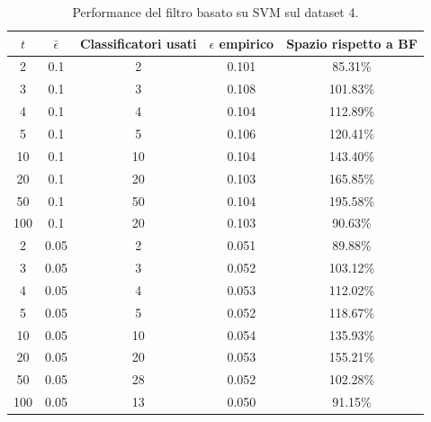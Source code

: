 \begin{table}
    \centering
    \begin{tabular}{|c|c|c|c|c|}
        \hline
        $t$ & $\bar\epsilon$ & Classificatori usati & $\epsilon$ empirico & Spazio rispetto a BF \\ 
        \hline
        2  & 0.1  & 2  & 0.101 & 85.31\% \\  
        3  & 0.1  & 3  & 0.108 & 101.83\% \\  
        4  & 0.1  & 4  & 0.104 & 112.89\% \\  
        5  & 0.1  & 5  & 0.106 & 120.41\% \\  
        10 & 0.1  & 10 & 0.104 & 143.40\% \\ 
        20 & 0.1  & 20 & 0.103 & 165.85\% \\ 
        50 & 0.1  & 50 & 0.104 & 195.58\% \\ 
        100 & 0.1 & 20 & 0.103 & 90.63\% \\  
        2  & 0.05 & 2  & 0.051 & 89.88\% \\  
        3  & 0.05 & 3  & 0.052 & 103.12\% \\  
        4  & 0.05 & 4  & 0.053 & 112.02\% \\  
        5  & 0.05 & 5  & 0.052 & 118.67\% \\  
        10 & 0.05 & 10 & 0.054 & 135.93\% \\ 
        20 & 0.05 & 20 & 0.053 & 155.21\% \\ 
        50 & 0.05 & 28 & 0.052 & 102.28\% \\ 
        100 & 0.05 & 13 & 0.050 & 91.15\% \\  
        \hline
    \end{tabular}
    \caption{Performance del filtro basato su SVM sul dataset 4.}
    \label{tab:performance-ds4-svm}
\end{table}
